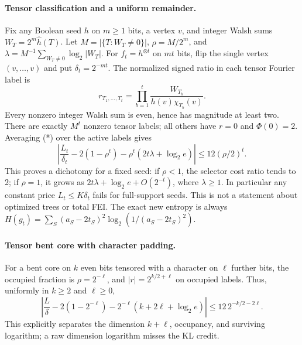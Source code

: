 \documentclass{article}
\begin{document}
\paragraph{Tensor classification and a uniform remainder.}
Fix any Boolean seed $h$ on $m\ge1$ bits, a vertex $v$, and
integer Walsh sums $W_T=2^m\widehat h(T)$.
Let $M=|\{T:W_T\ne0\}|$, $\rho=M/2^m$, and
$\lambda=M^{-1}\sum_{W_T\ne0}\log_2|W_T|$.
For $f_t=h^{\otimes t}$ on $mt$ bits, flip the single vertex
$(v,\ldots,v)$ and put $\delta_t=2^{-mt}$.
The normalized signed ratio in each tensor Fourier label is
\[
r_{T_1,\ldots,T_t}
=\prod_{b=1}^t\frac{W_{T_b}}{h(v)\chi_{T_b}(v)}.
\]
Every nonzero integer Walsh sum is even, hence has magnitude at least two.
There are exactly $M^t$ nonzero tensor labels; all others have $r=0$
and $\Phi(0)=2$. Averaging (*) over the active labels gives
\[
\boxed{\left|\frac{L_t}{\delta_t}
-2(1-\rho^t)-\rho^t(2t\lambda+\log_2e)\right|
\le12(\rho/2)^t.}
\]
This proves a dichotomy for a fixed seed: if $\rho<1$, the selector
cost ratio tends to 2; if $\rho=1$, it grows as
$2t\lambda+\log_2e+O(2^{-t})$, where $\lambda\ge1$.
In particular any constant price $L_t\le K\delta_t$ fails for full-support
seeds. This is not a statement about optimized trees or total FEI.
The exact new entropy is always
$H(g_t)=\sum_S (a_S-2t_S)^2\log_2(1/(a_S-2t_S)^2)$.

\paragraph{Tensor bent core with character padding.}
For a bent core on $k$ even bits tensored with a character on
$\ell$ further bits, the occupied fraction is $\rho=2^{-\ell}$,
and $|r|=2^{k/2+\ell}$ on occupied labels. Thus, uniformly in
$k\ge2$ and $\ell\ge0$,
\[
\left|\frac L\delta-2(1-2^{-\ell})
-2^{-\ell}(k+2\ell+\log_2e)\right|
\le12\,2^{-k/2-2\ell}.
\]
This explicitly separates the dimension $k+\ell$, occupancy,
and surviving logarithm; a raw dimension logarithm misses the KL credit.
\end{document}
